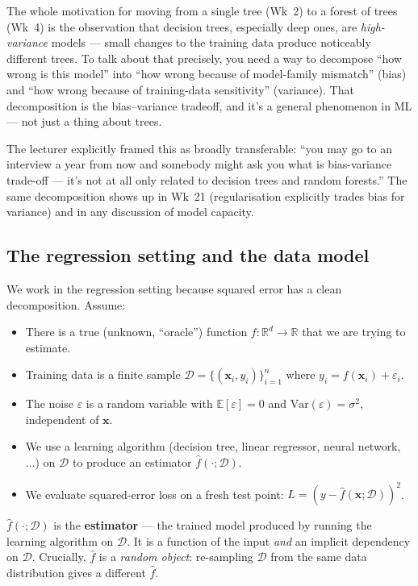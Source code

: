 \documentclass[11pt, a4paper]{article}
\begin{document}
The whole motivation for moving from a single tree (Wk~2) to a forest of trees (Wk~4) is the observation that decision trees, especially deep ones, are \emph{high-variance} models — small changes to the training data produce noticeably different trees. To talk about that precisely, you need a way to decompose ``how wrong is this model'' into ``how wrong because of model-family mismatch'' (bias) and ``how wrong because of training-data sensitivity'' (variance). That decomposition is the bias--variance tradeoff, and it's a general phenomenon in ML — not just a thing about trees.

\begin{notebox}
The lecturer explicitly framed this as broadly transferable: ``you may go to an interview a year from now and somebody might ask you what is bias-variance trade-off — it's not at all only related to decision trees and random forests.'' The same decomposition shows up in Wk~21 (regularisation explicitly trades bias for variance) and in any discussion of model capacity.
\end{notebox}

\subsection{The regression setting and the data model}

We work in the regression setting because squared error has a clean decomposition. Assume:

\begin{itemize}
  \item There is a true (unknown, ``oracle'') function $f: \mathbb{R}^d \to \mathbb{R}$ that we are trying to estimate.
  \item Training data is a finite sample $\mathcal{D} = \{(\mathbf{x}_i, y_i)\}_{i=1}^n$ where $y_i = f(\mathbf{x}_i) + \varepsilon_i$.
  \item The noise $\varepsilon$ is a random variable with $\mathbb{E}[\varepsilon] = 0$ and $\mathrm{Var}(\varepsilon) = \sigma^2$, independent of $\mathbf{x}$.
  \item We use a learning algorithm (decision tree, linear regressor, neural network, $\ldots$) on $\mathcal{D}$ to produce an estimator $\hat{f}(\cdot; \mathcal{D})$.
  \item We evaluate squared-error loss on a fresh test point: $L = (y - \hat{f}(\mathbf{x}; \mathcal{D}))^2$.
\end{itemize}

\begin{defbox}[Estimator]
$\hat{f}(\cdot; \mathcal{D})$ is the \textbf{estimator} — the trained model produced by running the learning algorithm on $\mathcal{D}$. It is a function of the input \emph{and} an implicit dependency on $\mathcal{D}$. Crucially, $\hat{f}$ is a \emph{random object}: re-sampling $\mathcal{D}$ from the same data distribution gives a different $\hat{f}$.
\end{defbox}
\end{document}
